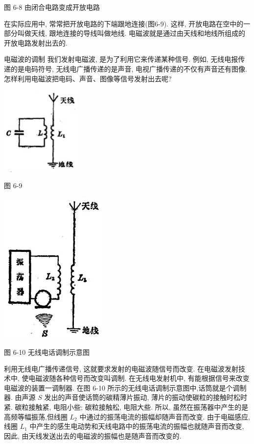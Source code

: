 \documentclass[10pt]{article}
\begin{document}
图 6-8 由闭合电路变成开放电路

在实际应用中, 常常把开放电路的下端跟地连接(图6-9). 这样, 开放电路在空中的一部分叫做天线, 跟地连接的导线叫做地线. 电磁波就是通过由天线和地线所组成的开放电路发射出去的.

电磁波的调制 我们发射电磁波, 是为了利用它来传递某种信号. 例如, 无线电报传递的是电码符号, 无线电广播传递的是声音, 电视广播传递的不仅有声音还有图像. 怎样利用电磁波把电码、声音、图像等信号发射出去呢?

\begin{center}
\includegraphics[max width=0.3\textwidth]{images/01913056-1f15-74d8-9184-9aab52c9d66b_203_830101.jpg}
\end{center}

图 6-9

\begin{center}
\includegraphics[max width=0.4\textwidth]{images/01913056-1f15-74d8-9184-9aab52c9d66b_203_231087.jpg}
\end{center}

图 6-10 无线电话调制示意图

利用无线电广播传递信号, 这就要求发射的电磁波随信号而改变. 在电磁波发射技术中, 使电磁波随各种信号而改变叫调制. 在无线电发射机中, 有能根据信号来改变电磁波的装置一调制器. 在图 6-10 所示的无线电话调制示意图中,话筒就是个调制器. 由声源 \(S\) 发出的声音使话筒的碳精薄片振动, 薄片的振动使碳粒的接触时松时紧. 碳粒接触紧, 电阻小些; 碳粒接触松, 电阻大些. 所以, 虽然在振荡器中产生的是高频等幅振荡,但线圈 \({L}_{2}\) 中通过的振荡电流的振幅却随声音而改变. 由于电磁感应,线圈 \({L}_{1}\) 中产生的感生电动势和天线电路中的振荡电流的振幅也就随声音而改变, 因此, 由天线发送出去的电磁波的振幅也是随声音而改变的.
\end{document}
